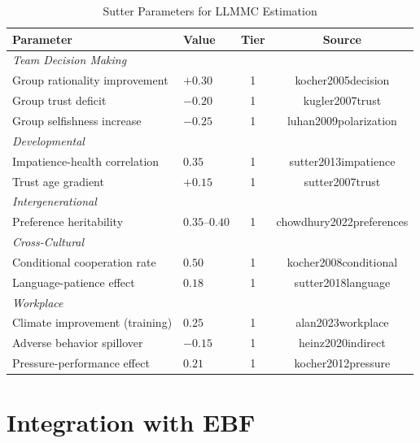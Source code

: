 \begin{table}[htbp]
\centering
\caption{Sutter Parameters for LLMMC Estimation}
\label{tab:su-parameters}
\renewcommand{\arraystretch}{1.3}
\begin{tabular}{@{}llcc@{}}
\toprule
\textbf{Parameter} & \textbf{Value} & \textbf{Tier} & \textbf{Source} \\
\midrule
\multicolumn{4}{l}{\textit{Team Decision Making}} \\
Group rationality improvement & $+0.30$ & 1 & kocher2005decision \\
Group trust deficit & $-0.20$ & 1 & kugler2007trust \\
Group selfishness increase & $-0.25$ & 1 & luhan2009polarization \\
\midrule
\multicolumn{4}{l}{\textit{Developmental}} \\
Impatience-health correlation & $0.35$ & 1 & sutter2013impatience \\
Trust age gradient & $+0.15$ & 1 & sutter2007trust \\
\midrule
\multicolumn{4}{l}{\textit{Intergenerational}} \\
Preference heritability & $0.35$--$0.40$ & 1 & chowdhury2022preferences \\
\midrule
\multicolumn{4}{l}{\textit{Cross-Cultural}} \\
Conditional cooperation rate & $0.50$ & 1 & kocher2008conditional \\
Language-patience effect & $0.18$ & 1 & sutter2018language \\
\midrule
\multicolumn{4}{l}{\textit{Workplace}} \\
Climate improvement (training) & $0.25$ & 1 & alan2023workplace \\
Adverse behavior spillover & $-0.15$ & 1 & heinz2020indirect \\
Pressure-performance effect & $0.21$ & 1 & kocher2012pressure \\
\bottomrule
\end{tabular}
\end{table}


\section{Integration with EBF}
\label{sec:su-integration}

